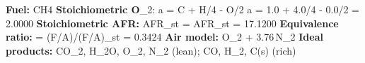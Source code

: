 \textbf{Fuel: }CH4
\textbf{Stoichiometric O}_2:\; a = C + H/4 - O/2
a = 1.0 + 4.0/4 - 0.0/2 = 2.0000
\textbf{Stoichiometric AFR: }\; AFR_{st} = 
AFR_{st} = 17.1200
\textbf{Equivalence ratio: }\; \phi = (F/A)/(F/A)_{st}
\phi = 0.3424
\textbf{Air model: }\; O_2 + 3.76\,N_2
\textbf{Ideal products: }\; CO_2, H_2O, O_2, N_2 (lean); CO, H_2, C(s) (rich)